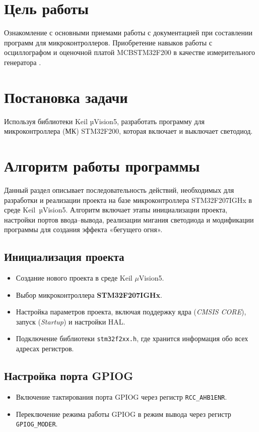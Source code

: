 \section{Цель работы}
Ознакомление с основными приемами работы с документацией при
составлении программ для микроконтроллеров. Приобретение навыков работы с
осциллографом и оценочной платой MCBSTM32F200 в качестве измерительного
генератора	.

\section{Постановка задачи}
Используя библиотеки Keil µVision5, разработать
программу для микроконтроллера (МК) STM32F200, которая включает и выключает
светодиод.
\section{Алгоритм работы программы}

Данный раздел описывает последовательность действий, необходимых для разработки и реализации проекта на базе микроконтроллера STM32F207IGHx в среде Keil~µVision5. Алгоритм включает этапы инициализации проекта, настройки портов ввода–вывода, реализации мигания светодиода и модификации программы для создания эффекта «бегущего огня».

\subsection{Инициализация проекта}
\begin{itemize}
    \item Создание нового проекта в среде Keil \(\mu\)Vision5.
    \item Выбор микроконтроллера \textbf{STM32F207IGHx}.
    \item Настройка параметров проекта, включая поддержку ядра (\textit{CMSIS CORE}), запуск (\textit{Startup}) и настройки HAL.
    \item Подключение библиотеки \texttt{stm32f2xx.h}, где хранится информация обо всех адресах регистров.
\end{itemize}

\subsection{Настройка порта GPIOG}
\begin{itemize}
    \item Включение тактирования порта GPIOG через регистр \texttt{RCC\_AHB1ENR}.
    \item Переключение режима работы GPIOG в режим вывода через регистр \texttt{GPIOG\_MODER}.
\end{itemize}

